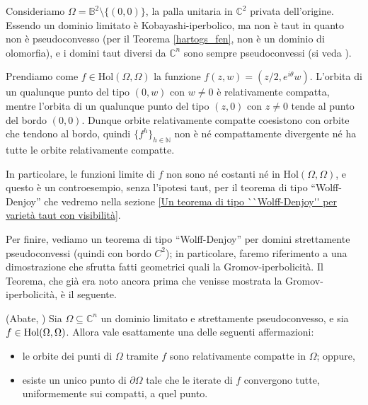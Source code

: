 \begin{ex} \label{servetaut}
    Consideriamo $\Omega=\mathbb{B}^2\setminus\{(0,0)\}$, la palla unitaria in $\mathbb{C}^2$ privata dell'origine. Essendo un dominio limitato è Kobayashi-iperbolico, ma non è taut in quanto non è pseudoconvesso (per il Teorema \ref{hartogs_fen}, non è un dominio di olomorfia), e i domini taut diversi da $\mathbb{C}^n$ sono sempre pseudoconvessi (si veda \cite[Theorem F]{W}).

    Prendiamo come $f\in\text{Hol}(\Omega,\Omega)$ la funzione $f(z,w)=(z/2,e^{i\theta}w)$. L'orbita di un qualunque punto del tipo $(0,w)$ con $w\not=0$ è relativamente compatta, mentre l'orbita di un qualunque punto del tipo $(z,0)$ con $z\not=0$ tende al punto del bordo $(0,0)$. Dunque orbite relativamente compatte coesistono con orbite che tendono al bordo, quindi $\{f^h\}_{h\in\mathbb{N}}$ non è né compattamente divergente né ha tutte le orbite relativamente compatte.
    
    In particolare, le funzioni limite di $f$ non sono né costanti né in $\text{Hol}(\Omega,\Omega)$, e questo è un controesempio, senza l'ipotesi taut, per il teorema di tipo ``Wolff-Denjoy'' che vedremo nella sezione \ref{Un teorema di tipo ``Wolff-Denjoy'' per varietà taut con visibilità}.
\end{ex}

Per finire, vediamo un teorema di tipo ``Wolff-Denjoy'' per domini strettamente pseudoconvessi (quindi con bordo $C^2$); in particolare, faremo riferimento a una dimostrazione che sfrutta fatti geometrici quali la Gromov-iperbolicità. Il Teorema, che già era noto ancora prima che venisse mostrata la Gromov-iperbolicità, è il seguente.

\begin{thm} \label{abate_wd}
    (Abate, \cite[Theorem 0.5]{A2}) Sia $\Omega \subseteq \mathbb{C}^n$ un dominio limitato e strettamente pseudoconvesso, e sia $f \in \textnormal{Hol}(\Omega,\Omega)$. Allora vale esattamente una delle seguenti affermazioni:
    \begin{itemize}
        \item le orbite dei punti di $\Omega$ tramite $f$ sono relativamente compatte in $\Omega$; oppure,
        \item esiste un unico punto di $\partial\Omega$ tale che le iterate di $f$ convergono tutte, uniformemente sui compatti, a quel punto.
    \end{itemize}
\end{thm}

